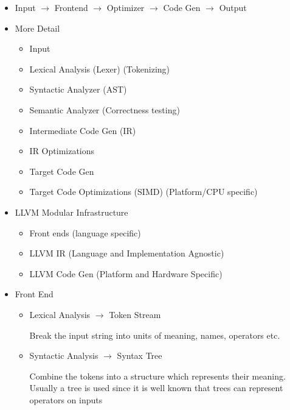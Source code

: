 \documentclass{report}
\begin{document}
\begin{itemize}
    \item Input $\to$ Frontend $\to$ Optimizer $\to$ Code Gen $\to$ Output
    \item More Detail
        \begin{itemize}
            \item Input
            \item Lexical Analysis (Lexer) (Tokenizing)
            \item Syntactic Analyzer (AST)
            \item Semantic Analyzer (Correctness testing)
            \item Intermediate Code Gen (IR)
            \item IR Optimizations
            \item Target Code Gen
            \item Target Code Optimizations (SIMD) (Platform/CPU specific)
        \end{itemize}
    \item LLVM Modular Infrastructure
        \begin{itemize}
            \item Front ends (language specific)
            \item LLVM IR (Language and Implementation Agnostic)
            \item LLVM Code Gen (Platform and Hardware Specific)
        \end{itemize}
    \item Front End
        \begin{mdframed}
            \begin{itemize}
                \item Lexical Analysis $\to$ Token Stream
                    \begin{mdframed}
                        Break the input string into units of 
                        meaning, names, operators etc.
                    \end{mdframed}
                \item Syntactic Analysis $\to$ Syntax Tree
                    \begin{mdframed}
                        Combine the tokens into a structure which
                        represents their meaning. Usually a tree is used
                        since it is well known that trees can represent operators
                        on inputs
                    \end{mdframed}

\end{itemize}
\end{mdframed}
\end{itemize}
\end{document}

